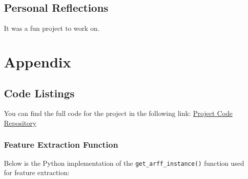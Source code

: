 \documentclass[12pt,a4paper]{article}
\begin{document}
\subsection*{Personal Reflections}
It was a fun project to work on.


\newpage
\section{Appendix}

\subsection{Code Listings}

You can find the full code for the project in the following link:
\href{https://github.com/carlos1302-ai/projec1_ml}{Project Code Repository}


\subsubsection{Feature Extraction Function}
\label{sec:feature-extraction}

Below is the Python implementation of the \texttt{get\_arff\_instance()} function used for feature extraction:
\end{document}
